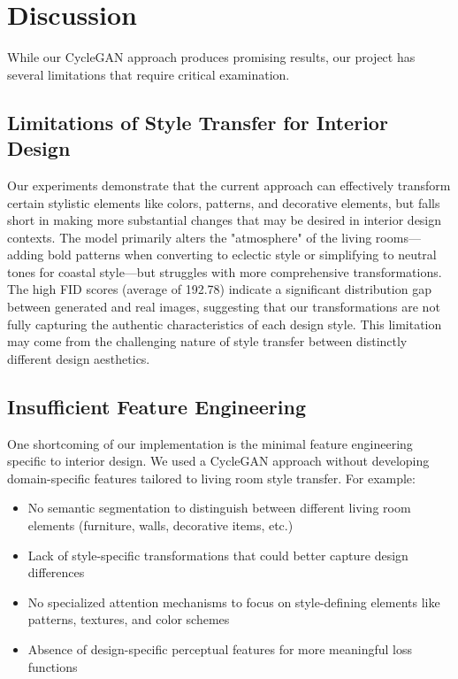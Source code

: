 \documentclass[twocolumn,superscriptaddress,aps]{revtex4-1}
\begin{document}
\section{Discussion}

While our CycleGAN approach produces promising results, our project has several limitations that require critical examination.

\subsection{Limitations of Style Transfer for Interior Design}

Our experiments demonstrate that the current approach can effectively transform certain stylistic elements like colors, patterns, and decorative elements, but falls short in making more substantial changes that may be desired in interior design contexts. The model primarily alters the "atmosphere" of the living rooms—adding bold patterns when converting to eclectic style or simplifying to neutral tones for coastal style—but struggles with more comprehensive transformations. \\

The high FID scores (average of 192.78) indicate a significant distribution gap between generated and real images, suggesting that our transformations are not fully capturing the authentic characteristics of each design style. This limitation may come from the challenging nature of style transfer between distinctly different design aesthetics.

\subsection{Insufficient Feature Engineering}

One shortcoming of our implementation is the minimal feature engineering specific to interior design. We used a CycleGAN approach without developing domain-specific features tailored to living room style transfer. For example:

\begin{itemize}
    \item No semantic segmentation to distinguish between different living room elements (furniture, walls, decorative items, etc.)
    \item Lack of style-specific transformations that could better capture design differences
    \item No specialized attention mechanisms to focus on style-defining elements like patterns, textures, and color schemes
    \item Absence of design-specific perceptual features for more meaningful loss functions
\end{itemize}
\end{document}
